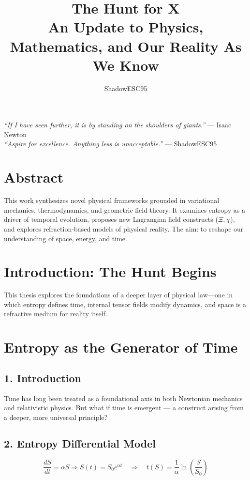\documentclass[12pt]{article}
\title{The Hunt for X\\\large An Update to Physics, Mathematics, and Our Reality As We Know}
\author{ShadowESC95}
\date{}
\begin{document}
\maketitle

\begin{center}
\textit{“If I have seen further, it is by standing on the shoulders of giants.”} — Isaac Newton\\[0.3cm]
\textit{“Aspire for excellence. Anything less is unacceptable.”} — ShadowESC95
\end{center}

\section*{Abstract}
This work synthesizes novel physical frameworks grounded in variational mechanics, thermodynamics, and geometric field theory. It examines entropy as a driver of temporal evolution, proposes new Lagrangian field constructs (\(\Xi, \chi\)), and explores refraction-based models of physical reality. The aim: to reshape our understanding of space, energy, and time.

\section{Introduction: The Hunt Begins}
This thesis explores the foundations of a deeper layer of physical law—one in which entropy defines time, internal tensor fields modify dynamics, and space is a refractive medium for reality itself.

\section{Entropy as the Generator of Time}
\subsection*{1. Introduction}
Time has long been treated as a foundational axis in both Newtonian mechanics and relativistic physics. But what if time is emergent — a construct arising from a deeper, more universal principle?

\subsection*{2. Entropy Differential Model}
\[
\frac{dS}{dt} = \alpha S \Rightarrow S(t) = S_0 e^{\alpha t}
\quad \Rightarrow \quad t(S) = \frac{1}{\alpha} \ln\left( \frac{S}{S_0} \right)
\]
\end{document}
